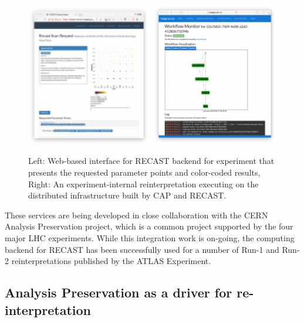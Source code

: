 \begin{figure}[t]
\begin{center}
\includegraphics[width=0.5\textwidth,angle=0]{ch5-figures/requestview.pdf}\includegraphics[width=0.5\textwidth,angle=0]{ch5-figures/monitor.pdf}

\end{center}
\caption{
Left: Web-based interface for RECAST backend for experiment that presents the requested parameter points and color-coded results,
Right: An experiment-internal reinterpretation executing on the distributed infrastructure built by CAP and RECAST.}
\label{fig:recast-cc}
\end{figure}

These services are being developed in close collaboration with the CERN Analysis Preservation project, which is a common project supported by the four major LHC experiments. While this integration work is on-going, the computing backend for RECAST has been successfully used for a number of Run-1 and Run-2 reinterpretations published by the ATLAS Experiment.


\subsection{Analysis Preservation as a driver for re-interpretation}


